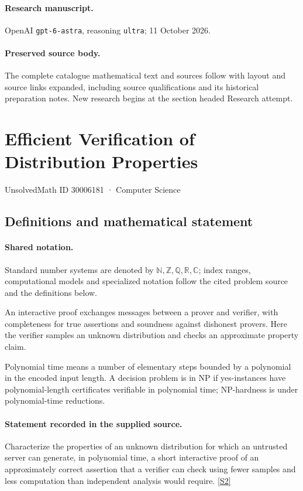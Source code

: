\documentclass[11pt]{article}
\begin{document}
\paragraph{Research manuscript.} OpenAI \texttt{gpt-6-astra}, reasoning \texttt{ultra}; 11 October 2026.
\paragraph{Preserved source body.} The complete catalogue mathematical text and sources follow with layout and source links expanded, including source qualifications and its historical preparation notes. New research begins at the section headed Research attempt.

\section{Efficient Verification of Distribution Properties}\label{30006181}
{\small UnsolvedMath ID 30006181 · Computer Science}
\subsection{Definitions and mathematical statement}

\paragraph{Shared notation.}Standard number systems are denoted by $\mathbb N,\mathbb Z,\mathbb Q,\mathbb R,\mathbb C$; index ranges, computational models and specialized notation follow the cited problem source and the definitions below.


An interactive proof exchanges messages between a prover and verifier, with completeness for true assertions and soundness against dishonest provers. Here the verifier samples an unknown distribution and checks an approximate property claim.

Polynomial time means a number of elementary steps bounded by a polynomial in the encoded input length. A decision problem is in $\mathrm{NP}$ if yes-instances have polynomial-length certificates verifiable in polynomial time; NP-hardness is under polynomial-time reductions.
\paragraph{Statement recorded in the supplied source.}
Characterize the properties of an unknown distribution for which an untrusted server can generate, in polynomial time, a short interactive proof of an approximately correct assertion that a verifier can check using fewer samples and less computation than independent analysis would require. \href{https://doi.org/10.4171/owr/2025/3}{[S2]}
\end{document}
